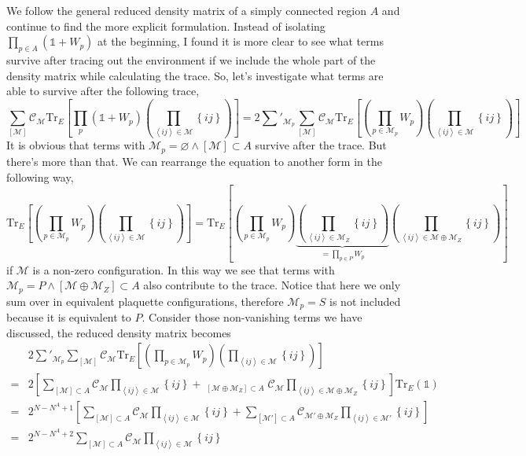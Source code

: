 \documentclass[12font]{article}
\theoremstyle{definition}
\numberwithin{equation}{section}
\newcommand{\anglelr}[1]{\left\langle #1 \right\rangle}
\newcommand{\lr}[1]{\left(  #1  \right)}
\newcommand{\lrm}[1]{\left[  #1  \right]}
\newcommand{\lrg}[1]{\left\{  #1  \right\}}
\newcommand{\mrm}[1]{\mathrm{#1}}
\newcommand{\alert}[1]{{\color{red}#1}}
\newcommand{\Tr}{\mrm{Tr}}
\begin{document}
We follow the general reduced density matrix of a simply connected region $A$ and continue to find the more explicit formulation. Instead of isolating $\prod_{p\in A}\lr{\mathds{1}+W_p}$ at the beginning, I found it is more clear to see what terms survive after tracing out the environment if we include the whole part of the density matrix while calculating the trace. So, let's investigate what terms are able to survive after the following trace,
\[
\sum_{[\mathcal{M}]}\mathcal{C}_{\mathcal{M}}\Tr_E\lrm{\prod_{p}\lr{\mathds{1} + W_p}\lr{\prod_{\anglelr{ij} \in \mathcal{M}}\lrg{ij}}}
=
2\sum'_{\mathcal{M}_p}\sum_{[\mathcal{M}]}\mathcal{C}_{\mathcal{M}} \Tr_E\lrm{ \lr{\prod_{p\in\mathcal{M}_p}W_p } \lr{\prod_{\anglelr{ij} \in \mathcal{M}}\lrg{ij}}}
\]
It is obvious that terms with $\mathcal{M}_p=\varnothing\wedge[\mathcal{M}]\subset A$ survive after the trace. But there's more than that. We can rearrange the equation to another form in the following way,
\[
  \Tr_E\lrm{ \lr{\prod_{p\in\mathcal{M}_p}W_p } \lr{\prod_{\anglelr{ij} \in \mathcal{M}}\lrg{ij}}} = 
  \Tr_E\lrm{ \lr{\prod_{p\in\mathcal{M}_p}W_p } \underbrace{\lr{\prod_{\anglelr{ij} \in \mathcal{M}_Z}\lrg{ij}}}_{ =\prod_{p\in P}W_p } \lr{\prod_{\anglelr{ij} \in \mathcal{M}\oplus\mathcal{M}_Z}\lrg{ij}}} 
\]
\alert{if $\mathcal{M}$ is a non-zero configuration.} In this way we see that terms with $\mathcal{M}_p=P\wedge [\mathcal{M}\oplus\mathcal{M}_Z]\subset A$ also contribute to the trace. Notice that here we only sum over in equivalent plaquette configurations, therefore $\mathcal{M}_p = S$ is not included because it is equivalent to $P$. Consider those non-vanishing terms we have discussed, the reduced density matrix becomes
\begin{align*}
  &2\sum'_{\mathcal{M}_p}\sum_{[\mathcal{M}]}\mathcal{C}_{\mathcal{M}} \Tr_E\lrm{ \lr{\prod_{p\in\mathcal{M}_p}W_p } \lr{\prod_{\anglelr{ij} \in \mathcal{M}}\lrg{ij}}}\\
  =& 2\lrm{ \sum_{[\mathcal{M}]\subset A} \mathcal{C}_{\mathcal{M}}\prod_{\anglelr{ij}\in\mathcal{M}}\lrg{ij} + 
  \mathop{\sum_{[\mathcal{M}]}}_{[\mathcal{M}\oplus\mathcal{M}_Z]\subset A}\mathcal{C}_{\mathcal{M}} \prod_{\anglelr{ij}\in\mathcal{M}\oplus\mathcal{M}_Z}\lrg{ij} }\Tr_E\lr{\mathds{1}} \\
  =& 2^{N-N^A+1}\lrm{ \sum_{[\mathcal{M}]\subset A} \mathcal{C}_{\mathcal{M}}\prod_{\anglelr{ij}\in\mathcal{M}}\lrg{ij} + 
  \sum_{[\mathcal{M}']\subset A}\mathcal{C}_{\mathcal{M}'\oplus\mathcal{M}_Z} \prod_{\anglelr{ij}\in\mathcal{M}'}\lrg{ij} } \\
  =& 2^{N-N^A+2}\sum_{[\mathcal{M}]\subset A} \mathcal{C}_{\mathcal{M}}\prod_{\anglelr{ij}\in\mathcal{M}}\lrg{ij} 
\end{align*}
\end{document}
